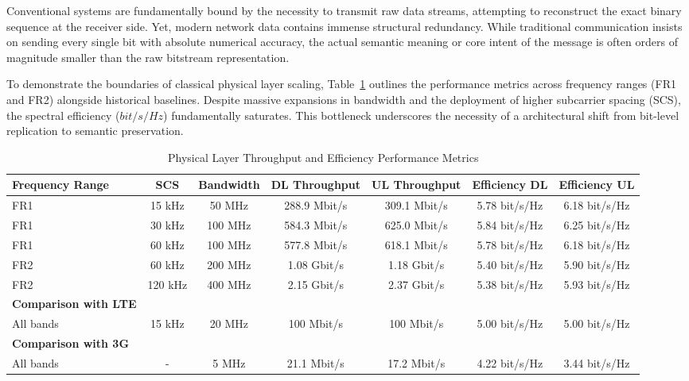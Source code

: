 \documentclass[10pt, conference]{IEEEtran}
\begin{document}
Conventional systems are fundamentally bound by the necessity to transmit raw data streams, attempting to reconstruct the exact binary sequence at the receiver side. Yet, modern network data contains immense structural redundancy. While traditional communication insists on sending every single bit with absolute numerical accuracy, the actual semantic meaning or core intent of the message is often orders of magnitude smaller than the raw bitstream representation. 

To demonstrate the boundaries of classical physical layer scaling, Table~\ref{tab:network_specs} outlines the performance metrics across frequency ranges (FR1 and FR2) alongside historical baselines. Despite massive expansions in bandwidth and the deployment of higher subcarrier spacing (SCS), the spectral efficiency ($bit/s/Hz$) fundamentally saturates. This bottleneck underscores the necessity of a architectural shift from bit-level replication to semantic preservation.

\begin{table}[t]
\centering
\caption{Physical Layer Throughput and Efficiency Performance Metrics}
\label{tab:network_specs}
\begin{tabular}{lcccccc}
\toprule
\textbf{Frequency Range} & \textbf{SCS} & \textbf{Bandwidth} & \textbf{DL Throughput} & \textbf{UL Throughput} & \textbf{Efficiency DL} & \textbf{Efficiency UL} \\
\midrule
FR1 & 15 kHz & 50 MHz & 288.9 Mbit/s & 309.1 Mbit/s & 5.78 bit/s/Hz & 6.18 bit/s/Hz \\
FR1 & 30 kHz & 100 MHz & 584.3 Mbit/s & 625.0 Mbit/s & 5.84 bit/s/Hz & 6.25 bit/s/Hz \\
FR1 & 60 kHz & 100 MHz & 577.8 Mbit/s & 618.1 Mbit/s & 5.78 bit/s/Hz & 6.18 bit/s/Hz \\
FR2 & 60 kHz & 200 MHz & 1.08 Gbit/s & 1.18 Gbit/s & 5.40 bit/s/Hz & 5.90 bit/s/Hz \\
FR2 & 120 kHz & 400 MHz & 2.15 Gbit/s & 2.37 Gbit/s & 5.38 bit/s/Hz & 5.93 bit/s/Hz \\
\midrule
\textbf{Comparison with LTE} & & & & & & \\
All bands & 15 kHz & 20 MHz & 100 Mbit/s & 100 Mbit/s & 5.00 bit/s/Hz & 5.00 bit/s/Hz \\
\midrule
\textbf{Comparison with 3G} & & & & & & \\
All bands & - & 5 MHz & 21.1 Mbit/s & 17.2 Mbit/s & 4.22 bit/s/Hz & 3.44 bit/s/Hz \\
\bottomrule
\end{tabular}
\end{table}
\end{document}

